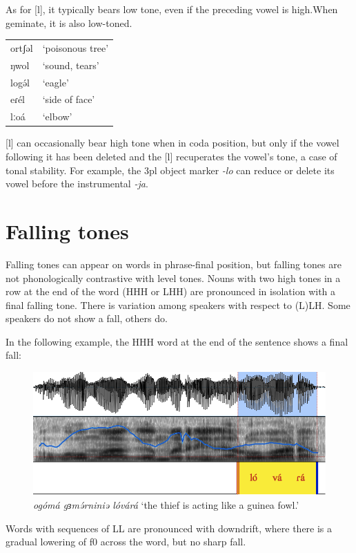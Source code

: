 As for [l], it typically bears low tone, even if the preceding vowel is high.When geminate, it is also low-toned.
\ea
\begin{tabular}[t]{ll}
ortʃəl	&	‘poisonous tree’\\
ŋwol	&	‘sound, tears’\\
logə́l	&	‘eagle’\\
eɾél	&	‘side of face’\\
lːoá	&	‘elbow’\\
\end{tabular}
\z

[l] can occasionally bear high tone when in coda position, but only if the vowel following it has been deleted and the [l] recuperates the vowel’s tone, a case of tonal stability. For example, the 3pl object marker \textit{-lo} can reduce or delete its vowel before the instrumental \textit{-ja}. 
	
\section{Falling tones}
Falling tones can appear on words in phrase-final position, but falling tones are not phonologically contrastive with level tones. Nouns with two high tones in a row at the end of the word (HHH or LHH) are pronounced in isolation with a final falling tone. There is variation among speakers with respect to (L)LH. Some speakers do not show a fall, others do. 

In the following example, the HHH word at the end of the sentence shows a final fall:
\begin{figure}
  \includegraphics[width=\linewidth]{figures/fig-ch4-1.png}
  \caption{\textit{ogómá gɜmə́rniniə lóvárá} ‘the thief is acting like a guinea fowl.’}
  \label{fig:4-1}
\end{figure}

Words with sequences of LL are pronounced with downdrift, where there is a gradual lowering of f0 across the word, but no sharp fall.

